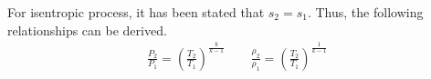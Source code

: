 For isentropic process, it has been stated that $s_2=s_1$. Thus, the following relationships can be derived.
\begin{align}
\frac{P_2}{P_1} = \left(\frac{T_2}{T_1}\right)^\frac{k}{k-1}\qquad
\frac{\rho_2}{\rho_1} = \left(\frac{T_2}{T_1}\right)^\frac{1}{k-1}\label{eq:C2_isrel}
\end{align}
%
%
